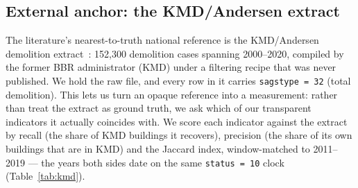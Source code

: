 \subsection{External anchor: the KMD/Andersen extract}\label{sec:kmd}
The literature's nearest-to-truth national reference is the KMD/Andersen
demolition extract~\cite{andersen2022adaptation}: 152{,}300 demolition
cases spanning 2000--2020, compiled by the former BBR administrator (KMD)
under a filtering recipe that was never published. We hold the raw file,
and every row in it carries \texttt{sagstype = 32} (total demolition). This
lets us turn an opaque reference into a measurement: rather than treat the
extract as ground truth, we ask which of our transparent indicators it
actually coincides with. We score each indicator against the extract by
recall (the share of KMD buildings it recovers), precision (the share of
its own buildings that are in KMD) and the Jaccard index, window-matched to
2011--2019 --- the years both sides date on the same \texttt{status = 10}
clock (Table~\ref{tab:kmd}).

